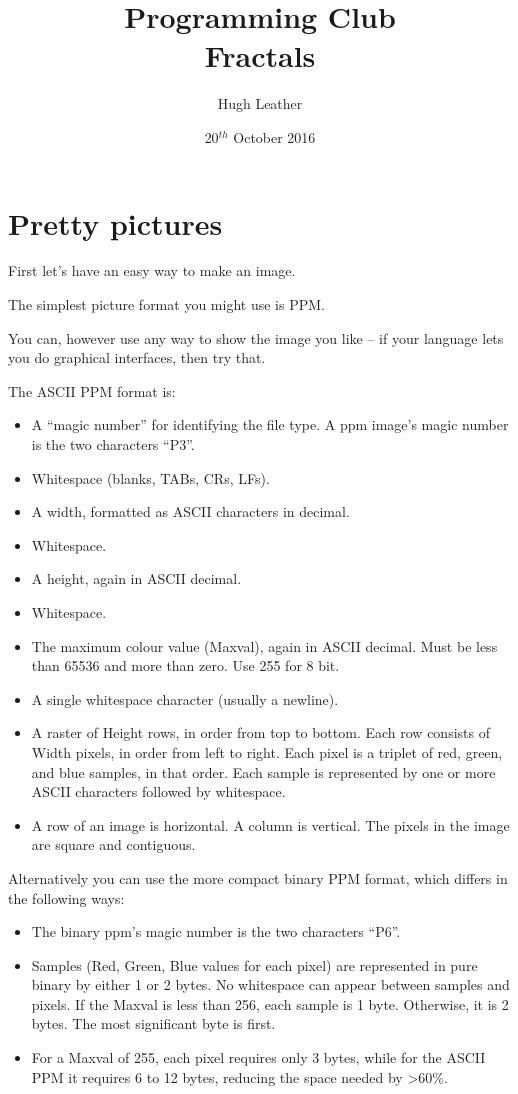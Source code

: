 \documentclass{article}
\title{
    \textbf{Programming Club}\\
    Fractals
}
\author{Hugh Leather}
\date{20$^{th}$ October 2016}
\begin{document}
    \maketitle
    
    \section{Pretty pictures}
        First let's have an easy way to make an image.  

        The simplest picture format you might use is PPM.

        You can, however use any way to show the image you like -- if your language lets you do graphical interfaces, then try that.
        
        The ASCII PPM format is:
        \begin{itemize}
			\setlength\itemsep{0pt}
            \item A ``magic number'' for identifying the file type. A ppm image's magic number is the two characters ``P3''.
            \item Whitespace (blanks, TABs, CRs, LFs).
            \item A width, formatted as ASCII characters in decimal.
            \item Whitespace.
            \item A height, again in ASCII decimal.
            \item Whitespace.
            \item The maximum colour value (Maxval), again in ASCII decimal. Must be less than 65536 and more than zero. Use 255 for 8 bit.
            \item A single whitespace character (usually a newline).
            \item A raster of Height rows, in order from top to bottom. Each row consists of Width pixels, in order from left to right.
            Each pixel is a triplet of red, green, and blue samples, in that order. Each sample is represented by one or more ASCII characters followed by whitespace. 
            \item A row of an image is horizontal. A column is vertical. The pixels in the image are square and contiguous.
        \end{itemize}

		Alternatively you can use the more compact binary PPM format, which differs in the following ways:
        \begin{itemize}
			\setlength\itemsep{0pt}
            \item The binary ppm's magic number is the two characters ``P6''.
			\item Samples (Red, Green, Blue values for each pixel) are represented in pure binary by either 1 or 2 bytes. No whitespace can appear
				between samples and pixels. If the Maxval is less than 256, each sample is 1 byte. Otherwise, it is 2 bytes. The most significant byte is first.
			\item For a Maxval of 255, each pixel requires only 3 bytes, while for the ASCII PPM it requires 6 to 12 bytes, reducing the space needed by \textgreater60\%. 
        \end{itemize}
\end{document}
